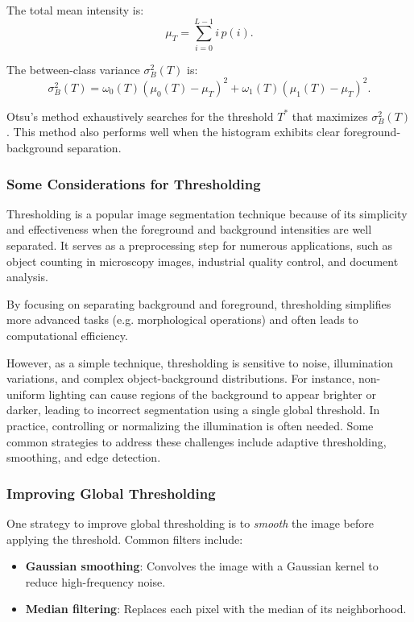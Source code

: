 \documentclass[a4paper,12pt]{article}
\begin{document}
The total mean intensity is:
\[
\mu_T = \sum_{i=0}^{L-1} i \, p(i).
\]

The between-class variance \(\sigma_B^2(T)\) is:
\[
\sigma_B^2(T) = \omega_0(T) \left( \mu_0(T) - \mu_T \right)^2 
+ \omega_1(T) \left( \mu_1(T) - \mu_T \right)^2.
\]

Otsu's method exhaustively searches for the threshold \(T^*\) that maximizes \(\sigma_B^2(T)\). This method also performs well when the histogram exhibits clear foreground-background separation.

\subsubsection{Some Considerations for Thresholding}

Thresholding is a popular image segmentation technique because of its simplicity and effectiveness when the foreground and background intensities are well separated. It serves as a preprocessing step for numerous applications, such as object counting in microscopy images, industrial quality control, and document analysis.

By focusing on separating background and foreground, thresholding simplifies more advanced tasks (e.g. morphological operations) and often leads to computational efficiency.

However, as a simple technique, thresholding is sensitive to noise, illumination variations, and complex object-background distributions. For instance, non-uniform lighting can cause regions of the background to appear brighter or darker, leading to incorrect segmentation using a single global threshold. In practice, controlling or normalizing the illumination is often needed. Some common strategies to address these challenges include adaptive thresholding, smoothing, and edge detection.

\subsubsection{Improving Global Thresholding}

One strategy to improve global thresholding is to \emph{smooth} the image before applying the threshold. Common filters include:
\begin{itemize}
    \item \textbf{Gaussian smoothing}: Convolves the image with a Gaussian kernel to reduce high-frequency noise.
    \item \textbf{Median filtering}: Replaces each pixel with the median of its neighborhood.
\end{itemize}
\end{document}
